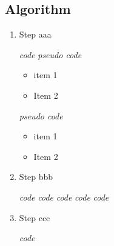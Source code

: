 \documentclass{article}
\begin{document}
\subsection*{Algorithm}

\begin{enumerate}
\item  Step aaa
  \begin{algorithmic}[1]
      \State \textit{code}
      \State \textit{pseudo code}
      \begin{itemize}
        \item{item 1}
        \item{Item 2}
      \end{itemize}         
      \State \textit{pseudo code}
      \begin{itemize}
        \item{item 1}
        \item{Item 2}
      \end{itemize}         
  \end{algorithmic}

\item Step bbb

  \begin{algorithmic}[1]
    \State \textit{code}
    \State \textit{code}
    \State \textit{code}
    \State \textit{code}
    \State \textit{code}
  \end{algorithmic}


\item Step ccc
      \begin{algorithmic}
    \State \textit{code}
   \end{algorithmic}
\end{enumerate}
\end{document}
